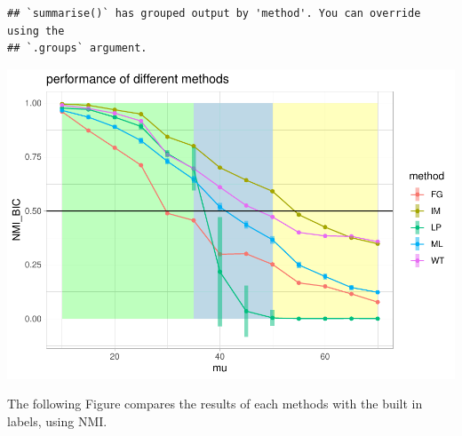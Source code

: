 \documentclass[
]{article}
\begin{document}
\begin{verbatim}
## `summarise()` has grouped output by 'method'. You can override using the
## `.groups` argument.
\end{verbatim}

\includegraphics{com_det_algorithms_files/figure-latex/unnamed-chunk-14-1.pdf}

The following Figure compares the results of each methods with the built
in labels, using NMI.
\end{document}
